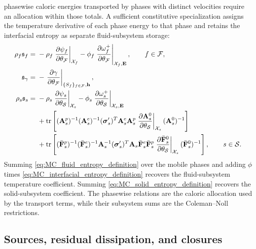 phasewise caloric energies transported by phases with distinct velocities
require an allocation within those totals.  A sufficient constitutive
specialization assigns the temperature derivative of each phase energy to that
phase and retains the interfacial entropy as separate fluid-subsystem storage:
%
\begin{subequations}
	\label{eq:MC_entropy_definitions}
	\begin{align}
		\rho_f\mathfrak{s}_f
		={} &
		-\rho_f
		\left.
		\frac{\partial \psi_f}{\partial \theta_{\mathcal{F}}}
		\right\vert_{\mathcal{X}_f}
		-\phi_f
		\left.
		\frac{\partial \omega^{+}_{f}}{\partial \theta_{\mathcal{F}}}
		\right\vert_{\mathcal{X}_f,\mathbf{E}},
		\qquad
		f\in\mathcal{F},
		\label{eq:MC_fluid_entropy_definition}
		\\
		\mathfrak{s}_\gamma
		={} &
		-
		\left.
		\frac{\partial \gamma}{\partial \theta_{\mathcal{F}}}
		\right\vert_{\{S_f\}_{f\in\mathcal{F}},\mathbf{h}},
		\label{eq:MC_interfacial_entropy_definition}
		\\
		\rho_s\mathfrak{s}_s
		={} &
		-\rho_s
		\left.
		\frac{\partial \psi_s}{\partial \theta_{\mathcal{S}}}
		\right\vert_{\mathcal{X}_s}
		-\phi_s
		\left.
		\frac{\partial \omega^{+}_{s}}{\partial \theta_{\mathcal{S}}}
		\right\vert_{\mathcal{X}_s,\mathbf{E}}
		\notag  \\
		    & +
		\operatorname{tr}\left[
			(\mathbf{A}_s^p)^{-1}
			(\mathbf{A}_s^e)^{-1}
			(\boldsymbol{\sigma}_s')^T
			\mathbf{A}_s^e\mathbf{A}_s^p
			\left.
			\frac{\partial \mathbf{A}_s^0}{\partial \theta_{\mathcal{S}}}
			\right\vert_{\mathcal{X}_s}
			(\mathbf{A}_s^0)^{-1}
		\right]
		\notag  \\
		    & +
		\operatorname{tr}\left[
		(\bar{\mathbf{F}}_s^p)^{-1}
		(\bar{\mathbf{F}}_s^e)^{-1}
		\mathbf{A}_s^{-1}
		(\boldsymbol{\sigma}_s')^T
		\mathbf{A}_s
		\bar{\mathbf{F}}_s^e
		\bar{\mathbf{F}}_s^p
		\left.
		\frac{\partial \bar{\mathbf{F}}_s^0}{\partial \theta_{\mathcal{S}}}
		\right\vert_{\mathcal{X}_s}
		(\bar{\mathbf{F}}_s^0)^{-1}
		\right],
		\qquad
		s\in\mathcal{S}.
		\label{eq:MC_solid_entropy_definition}
	\end{align}
\end{subequations}
%
Summing \eqref{eq:MC_fluid_entropy_definition} over the mobile phases and
adding \(\phi\) times \eqref{eq:MC_interfacial_entropy_definition} recovers
the fluid-subsystem temperature coefficient.  Summing
\eqref{eq:MC_solid_entropy_definition} recovers the solid-subsystem
coefficient.  The phasewise relations are the caloric allocation used by the
transport terms, while their subsystem sums are the Coleman--Noll
restrictions.

\subsection{Sources, residual dissipation, and closures}
\label{sec:MC_residual_dissipation}

